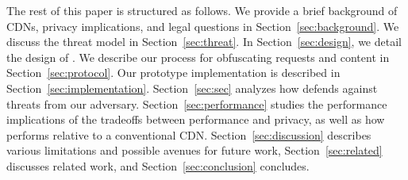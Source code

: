 %

The rest of this paper is structured as follows. We provide a brief background of CDNs, privacy implications, and legal questions in Section~\ref{sec:background}. We discuss the threat model in Section~\ref{sec:threat}. In Section~\ref{sec:design}, we detail the design of \system{}. We describe our process for obfuscating requests and content in Section~\ref{sec:protocol}.  Our prototype implementation is described in Section~\ref{sec:implementation}. Section~\ref{sec:sec} analyzes how \system{}
defends against threats from our adversary. Section~\ref{sec:performance} studies the performance implications of the tradeoffs between performance and privacy, as well as how \system{} performs relative to a conventional CDN. Section~\ref{sec:discussion} describes various limitations and possible avenues for future work, Section~\ref{sec:related} discusses related work, and Section~\ref{sec:conclusion} concludes.


